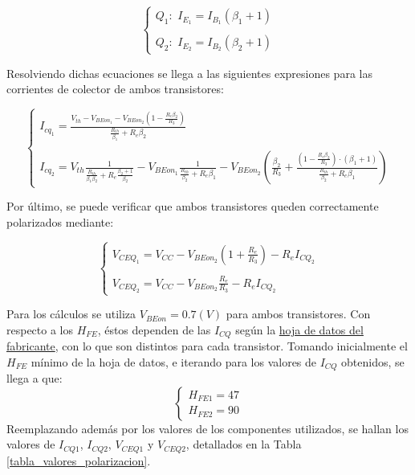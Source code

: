 	\begin{equation}
		\begin{cases}
		Q_{1}: \, \, I_{E_{1}} = I_{B_{1}}(\beta_{1}+1)\\ \\
		Q_{2}: \, \, I_{E_{2}}=I_{B_{2}}(\beta_{2}+1)
		\end{cases}
	\end{equation}

Resolviendo dichas ecuaciones se llega a las siguientes expresiones para las corrientes de colector de ambos transistores:

	\begin{equation}
		\begin{cases}
		I_{cq_{1}}=\frac{V_{th}-V_{BEon_{1}}-V_{BEon_{2}}\left(1-\frac{R_{e}\beta_{2}}{R_{3}}\right)}{\frac{R_{th}}{\beta_{1}}+R_{e}\beta_{2}}\\ \\
		I_{cq_{2}}=V_{th}\frac{1}{\frac{R_{th}}{\beta_{1}\beta_{2}}+R_{e}\frac{\beta_{2}+1}{\beta_{2}}}-V_{BEon_{1}}\frac{1}{\frac{R_{th}}{\beta_{2}}+R_{e}\beta_{1}}-V_{BEon_{2}}\left(\frac{\beta_{2}}{R_{3}}+\frac{\left(1-\frac{R_{e}\beta_{2}}{R_{3}}\right)\cdot(\beta_{1}+1)}{\frac{R_{th}}{\beta_{2}}+R_{e}\beta_{1}} \right)
		\end{cases}
	\end{equation}

Por último, se puede verificar que ambos transistores queden correctamente polarizados mediante:

	\begin{equation}
		\begin{cases}
		V_{CEQ_{1}}=V_{CC}-V_{BEon_{2}}\left(1+\frac{R_{e}}{R_{3}}\right)-R_{e}I_{CQ_{2}}\\ \\
		V_{CEQ_{2}}=V_{CC}-V_{BEon_{2}}\frac{R_{e}}{R_{3}}-R_{e}I_{CQ_{2}}
		\end{cases}
	\end{equation}
	

Para los cálculos se utiliza $V_{BEon}=0.7(V)$ para ambos transistores. Con respecto a los $H_{FE}$, éstos dependen de las $I_{CQ}$ según la \href{https://pdf1.alldatasheet.com/datasheet-pdf/view/171970/ONSEMI/BC337-40.html}{hoja de datos del fabricante}, con lo que son distintos para cada transistor. Tomando inicialmente el $H_{FE}$ mínimo de la hoja de datos, e iterando para los valores de $I_{CQ}$ obtenidos, se llega a que:
	\begin{equation*}
		\begin{cases}
		 H_{FE1} = 47\\
		 H_{FE2} = 90
		\end{cases}
	\end{equation*}
Reemplazando además por los valores de los componentes utilizados, se hallan los valores de $I_{CQ1}$, $I_{CQ2}$, $V_{CEQ1}$ y $V_{CEQ2}$, detallados en la Tabla \ref{tabla_valores_polarizacion}.

